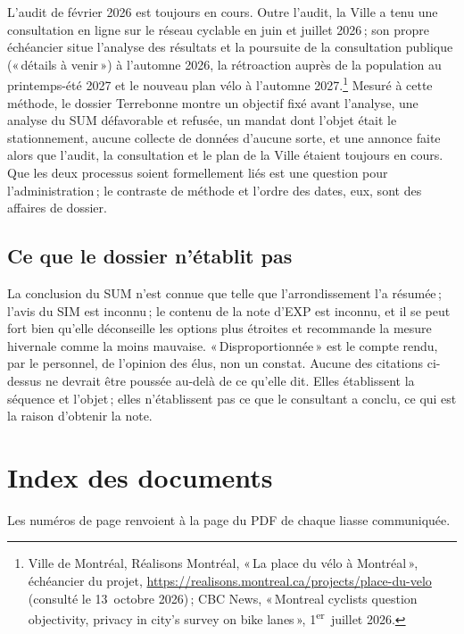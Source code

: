 \documentclass[11pt,letterpaper]{article}
\begin{document}
L'audit de février 2026 est toujours en cours. Outre l'audit, la Ville a tenu une
consultation en ligne sur le réseau cyclable en juin et juillet 2026\,;
son propre échéancier situe l'analyse des résultats et la poursuite de la
consultation publique («\,détails à venir\,») à l'automne 2026, la
rétroaction auprès de la population au printemps-été 2027 et le nouveau
plan vélo à l'automne 2027.\footnote{Ville de Montréal, Réalisons
Montréal, «\,La place du vélo à Montréal\,», échéancier du projet,
\url{https://realisons.montreal.ca/projects/place-du-velo} (consulté le 13~octobre 2026)\,; CBC News, «\,Montreal cyclists
question objectivity, privacy in city's survey on bike lanes\,»,
1\textsuperscript{er}~juillet 2026.} Mesuré à cette méthode, le dossier
Terrebonne montre un objectif fixé avant l'analyse, une analyse du SUM
défavorable et refusée, un mandat dont l'objet était le stationnement,
aucune collecte de données d'aucune sorte, et une annonce faite alors que
l'audit, la consultation et le plan de la Ville étaient toujours en cours.
Que les deux processus soient formellement liés est une question pour
l'administration\,; le contraste de méthode et l'ordre des dates, eux,
sont des affaires de dossier.

\subsection{Ce que le dossier n'établit pas}

La conclusion du SUM n'est connue que telle que l'arrondissement l'a
résumée\,; l'avis du SIM est inconnu\,; le contenu de la note d'EXP est
inconnu, et il se peut fort bien qu'elle déconseille les options plus
étroites et recommande la mesure hivernale comme la moins mauvaise.
«\,Disproportionnée\,» est le compte rendu, par le personnel, de l'opinion des
élus, non un constat. Aucune des citations ci-dessus ne devrait être
poussée au-delà de ce qu'elle dit. Elles établissent la séquence et
l'objet\,; elles n'établissent pas ce que le consultant a conclu, ce qui est
la raison d'obtenir la note.

\section{Index des documents}

Les numéros de page renvoient à la page du PDF de chaque liasse
communiquée.
\end{document}
